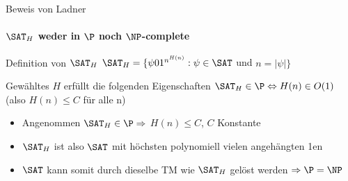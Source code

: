 % 				
% 		
% 	
% 	
\begin{frame}{Beweis von Ladner}
	\framesubtitle{${\SAT}_H$ weder in $\P$ noch  $\NP$-complete}
	\begin{KITinfoblock}{Definition von ${\SAT}_H$} 	
		${\SAT}_H = \lbrace \psi 01^{n^{H(n)}} : \psi \in \SAT$ und $ n = |\psi| \rbrace$
	\end{KITinfoblock}
	\bigskip
	\begin{KITblock}{Gewähltes $H$ erfüllt die folgenden Eigenschaften}
			${\SAT}_H \in \P \Leftrightarrow H(n) \in O(1)$ (also $H(n) \leq C$ f\"ur alle n) 		
	\end{KITblock}
	\pause
	\bigskip
	\pause
	\bigskip
	\begin{itemize}[<+->]
		\item Angenommen ${\SAT}_H \in \P \Rightarrow $  $H(n) \le C$, $C$ Konstante
		\item ${\SAT}_H$ ist also $\SAT$  mit höchsten polynomiell vielen  angehängten 1en
		\item $\SAT$ kann somit durch dieselbe TM wie ${\SAT}_H$ gelöst werden $\Rightarrow \P = \NP$
	\end{itemize}
	
\end{frame}

